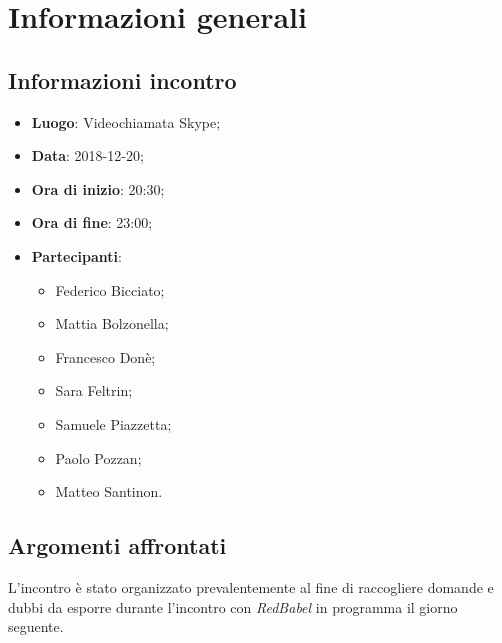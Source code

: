 \section{Informazioni generali}

\subsection{Informazioni incontro}
\begin{itemize}
\item \textbf{Luogo}: Videochiamata Skype;
\item \textbf{Data}: 2018-12-20;
\item \textbf{Ora di inizio}: 20:30;
\item \textbf{Ora di fine}: 23:00;
\item \textbf{Partecipanti}: 
	\begin{itemize}
		\item Federico Bicciato;
		\item Mattia Bolzonella;
		\item Francesco Donè;
		\item Sara Feltrin;
		\item Samuele Piazzetta;
		\item Paolo Pozzan;
		\item Matteo Santinon.
	\end{itemize}
\end{itemize}

\subsection{Argomenti affrontati}
L'incontro è stato organizzato prevalentemente al fine di raccogliere domande
e dubbi da esporre durante l'incontro con \textit{RedBabel} in programma il giorno 
seguente.
